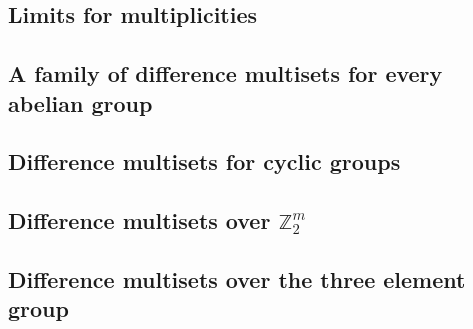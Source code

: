 \subsection{Limits for multiplicities}


\subsection{A family of difference multisets for every abelian group}
\label{sec:uni}


\subsection{Difference multisets for cyclic groups}


\subsection{Difference multisets over $\mathbb Z_2^m$}
\label{sec:z2i}


\subsection{Difference multisets over the three element group}
\label{sec:z3}

